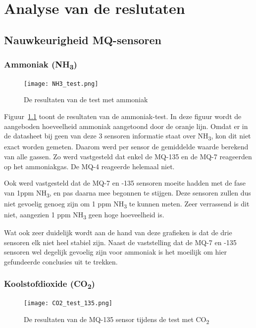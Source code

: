 \chapter{Analyse van de reslutaten}%
\label{ch:analyse}

\section{Nauwkeurigheid MQ-sensoren}
\label{sec:nauwkeurigheid}

\subsection{Ammoniak (NH\textsubscript{3})}
\label{subsec:nh3}


\begin{figure}[h!]
    \texttt{[image: NH3\_test.png]}
    \caption[Test met NH3]{De resultaten van de test met ammoniak}
    \label{fig:NH3_test}
\end{figure}

Figuur~\ref{fig:NH3_test} toont de resultaten van de ammoniak-test. In deze figuur wordt de aangeboden hoeveelheid ammoniak aangetoond door de oranje lijn. Omdat er in de datasheet bij geen van deze 3 sensoren informatie staat over NH\textsubscript{3}, kon dit niet exact worden gemeten. Daarom werd per sensor de gemiddelde waarde berekend van alle gassen. Zo werd vastgesteld dat enkel de MQ-135 en de MQ-7 reageerden op het ammoniakgas. De MQ-4 reageerde helemaal niet.

Ook werd vastgesteld dat de MQ-7 en -135 sensoren moeite hadden met de fase van 1ppm NH\textsubscript{3}, en pas daarna mee begonnen te stijgen. Deze sensoren zullen dus niet gevoelig genoeg zijn om 1 ppm NH\textsubscript{3} te kunnen meten. Zeer verrassend is dit niet, aangezien 1 ppm NH\textsubscript{3} geen hoge hoeveelheid is.

Wat ook zeer duidelijk wordt aan de hand van deze grafieken is dat de drie sensoren elk niet heel stabiel zijn. Naast de vaststelling dat de MQ-7 en -135 sensoren wel degelijk gevoelig zijn voor ammoniak is het moeilijk om hier gefundeerde conclusies uit te trekken.




\subsection{Koolstofdioxide (CO\textsubscript{2})}
\label{subsec:co2}

\begin{figure}[h!]
    \texttt{[image: CO2\_test\_135.png]}
    \caption[Test met CO2 (MQ135)]{De resultaten van de MQ-135 sensor tijdens de test met CO\textsubscript{2}}
    \label{fig:CO2_test_135}
\end{figure}


